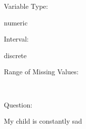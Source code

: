 \documentclass[
]{article}
\begin{document}
\begin{minipage}[t]{0.3\linewidth}

Variable Type:

\end{minipage}%
\begin{minipage}[t]{0.7\linewidth}

numeric

\end{minipage}

\begin{minipage}[t]{0.3\linewidth}

Interval:

\end{minipage}%
\begin{minipage}[t]{0.7\linewidth}

discrete

\end{minipage}

\begin{minipage}[t]{0.3\linewidth}

Range of Missing Values:

\end{minipage}%
\begin{minipage}[t]{0.7\linewidth}

~

\end{minipage}

\begin{minipage}[t]{0.3\linewidth}

Question:

\end{minipage}%
\begin{minipage}[t]{0.7\linewidth}

My child is constantly sad

\end{minipage}
\end{document}
